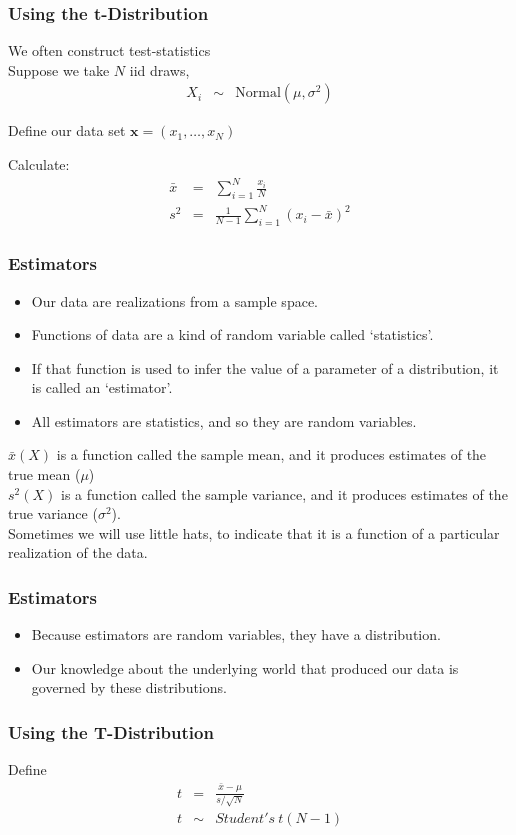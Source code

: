 \documentclass{beamer}
\numberwithin{equation}{section}
\begin{document}
\begin{frame}
\frametitle{Using the t-Distribution}

We often construct \alert{test-statistics}\\
Suppose we take $N$ iid draws, 
\begin{eqnarray}
X_{i} & \sim & \text{Normal}(\mu, \sigma^2) \nonumber 
\end{eqnarray}

Define our data set $\boldsymbol{x} = (x_{1}, \hdots, x_{N})$

Calculate:
\begin{eqnarray}
 \bar{x} & = &  \sum_{i=1}^{N} \frac{x_{i}}{N} \nonumber \\
 s^2 & = & \frac{1}{N-1} \sum_{i=1}^{N} (x_{i} - \bar{x})^2 \nonumber 
\end{eqnarray}

\end{frame}

\begin{frame}
\frametitle{Estimators}
\begin{itemize}
\item Our data are realizations from a sample space.\pause
\item Functions of data are a kind of random variable called `statistics'. \pause  
\item If that function is used to infer the value of a parameter of a distribution, it is called an `estimator'.\pause
\item All estimators are statistics, and so they are random variables.\pause
\end{itemize}
$\bar{x}(X)$ is a function called the sample mean, and it produces estimates of the true mean ($\mu$)\\ \pause
$s^2(X)$ is a function called the sample variance, and it produces estimates of the true variance ($\sigma^2$).\\ \pause
Sometimes we will use little hats, to indicate that it is a function of a particular realization of the data.

\end{frame}
\begin{frame}
\frametitle{Estimators}
\begin{itemize}
\item Because estimators are random variables, they have a distribution.\pause
\item Our knowledge about the underlying world that produced our data is governed by these distributions.
\end{itemize}
\end{frame}

\begin{frame}
\frametitle{Using the T-Distribution}

Define 
\begin{eqnarray}
t & = & \frac{\bar{x} - \mu}{s/\sqrt{N}} \nonumber \\
t & \sim &Student's\ t(N-1) \nonumber 
\end{eqnarray}


\end{frame}
\end{document}
